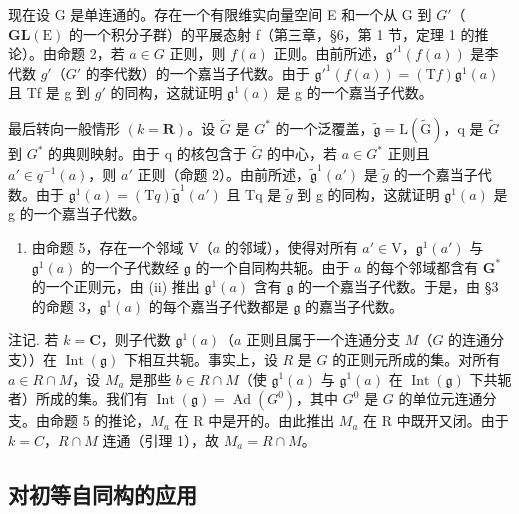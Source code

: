 现在设 G 是单连通的。存在一个有限维实向量空间 E 和一个从 G 到 \(G'\)（\(\mathbf{GL}(\mathrm{E})\) 的一个积分子群）的平展态射 f（第三章，§6，第 1 节，定理 1 的推论）。由命题 2，若 \(a \in G\) 正则，则 \(f(a)\) 正则。由前所述，\(\mathfrak{g}'^{1}(f(a))\) 是李代数 \(g'\)（\(G'\) 的李代数）的一个嘉当子代数。由于 \(\mathfrak{g}'^{1}(f(a)) = (\mathrm{T}f)\mathfrak{g}^{1}(a)\) 且 Tf 是 g 到 \(g'\) 的同构，这就证明 \(\mathfrak{g}^{1}(a)\) 是 g 的一个嘉当子代数。

最后转向一般情形 \((k = \mathbf{R})\)。设 \(\tilde{G}\) 是 \(G^{*}\) 的一个泛覆盖，\(\tilde{\mathfrak{g}} = \mathrm{L}(\tilde{\mathrm{G}})\)，q 是 \(\tilde{G}\) 到 \(G^{*}\) 的典则映射。由于 q 的核包含于 \(\tilde{G}\) 的中心，若 \(a \in G^{*}\) 正则且 \(a' \in q^{-1}(a)\)，则 \(a'\) 正则（命题 2）。由前所述，\(\tilde{\mathfrak{g}}^{1}(a')\) 是 \(\tilde{g}\) 的一个嘉当子代数。由于 \(\mathfrak{g}^{1}(a) = (\mathrm{T}q)\tilde{\mathfrak{g}}^{1}(a')\) 且 Tq 是 \(\tilde{g}\) 到 g 的同构，这就证明 \(\mathfrak{g}^{1}(a)\) 是 g 的一个嘉当子代数。

\begin{enumerate}
\def\labelenumi{(\roman{enumi})}
\setcounter{enumi}{2}
\tightlist
\item
  由命题 5，存在一个邻域 \(\mathrm{V}\)（\(a\) 的邻域），使得对所有 \(a' \in \mathrm{V}\)，\(\mathfrak{g}^1(a')\) 与 \(\mathfrak{g}^1(a)\) 的一个子代数经 \(\mathfrak{g}\) 的一个自同构共轭。由于 \(a\) 的每个邻域都含有 \(\mathbf{G}^*\) 的一个正则元，由 (ii) 推出 \(\mathfrak{g}^1(a)\) 含有 \(\mathfrak{g}\) 的一个嘉当子代数。于是，由 §3 的命题 3，\(\mathfrak{g}^1(a)\) 的每个嘉当子代数都是 \(\mathfrak{g}\) 的嘉当子代数。
\end{enumerate}

注记. 若 \(k = \mathbf{C}\)，则子代数 \(\mathfrak{g}^1(a)\)（\(a\) 正则且属于一个连通分支 \(M\)（\(G\) 的连通分支））在 \(\operatorname{Int}(\mathfrak{g})\) 下相互共轭。事实上，设 \(R\) 是 \(G\) 的正则元所成的集。对所有 \(a \in R \cap M\)，设 \(M_a\) 是那些 \(b \in R \cap M\)（使 \(\mathfrak{g}^1(a)\) 与 \(\mathfrak{g}^1(a)\) 在 \(\operatorname{Int}(\mathfrak{g})\) 下共轭者）所成的集。我们有 \(\operatorname{Int}(\mathfrak{g}) = \operatorname{Ad}(G^0)\)，其中 \(G^0\) 是 \(G\) 的单位元连通分支。由命题 5 的推论，\(M_{a}\) 在 R 中是开的。由此推出 \(M_{a}\) 在 R 中既开又闭。由于 \(k = C\)，\(R \cap M\) 连通（引理 1），故 \(M_{a} = R \cap M\)。

\subsection{对初等自同构的应用}

